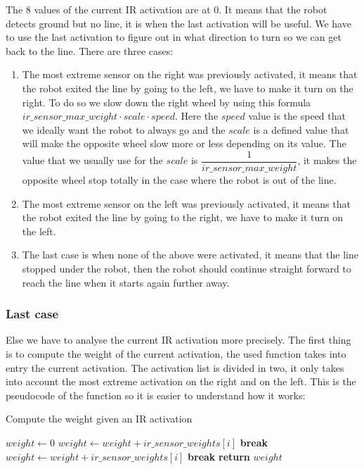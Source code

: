 The 8 values of the current IR activation are at 0.
It means that the robot detects ground but no line, it is when the last activation will be useful.
We have to use the last activation to figure out in what direction to turn so we can get back to the line.
There are three cases:
\begin{enumerate}
    \item The most extreme sensor on the right was previously activated, it means that the robot exited the line by going to the left, we have to make it turn on the right.
        To do so we slow down the right wheel by using this formula $ir\_sensor\_max\_weight \cdot scale \cdot speed$.
        Here the $speed$ value is the speed that we ideally want the robot to always go and the $scale$ is a defined value that will make the opposite wheel slow more or less depending on its value.
        The value that we usually use for the $scale$ is $\dfrac{1}{ir\_sensor\_max\_weight}$, it makes the opposite wheel stop totally in the case where the robot is out of the line.
    \item The most extreme sensor on the left was previously activated, it means that the robot exited the line by going to the right, we have to make it turn on the left.
    \item The last case is when none of the above were activated, it means that the line stopped under the robot, then the robot should continue straight forward to reach the line when it starts again further away.
\end{enumerate}

\subsubsection*{Last case}

Else we have to analyse the current IR activation more precisely.
The first thing is to compute the weight of the current activation, the used function takes into entry the current activation.
The activation list is divided in two, it only takes into account the most extreme activation on the right and on the left.
This is the pseudocode of the function so it is easier to understand how it works:

\FloatBarrier
\begin{algorithm}
    \caption{Compute the weight given an IR activation}
    \label{compute_ir_weight}
    \begin{algorithmic}[1]
            \State $weight \gets 0$
                    \State $weight \gets weight + ir\_sensor\_weights[i]$
                    \State \textbf{break}
                \EndIf
            \EndFor
                    \State $weight \gets weight + ir\_sensor\_weights[i]$
                    \State \textbf{break}
                \EndIf
            \EndFor
            \State \textbf{return} $weight$
        \EndProcedure
    \end{algorithmic}
\end{algorithm}
\FloatBarrier

